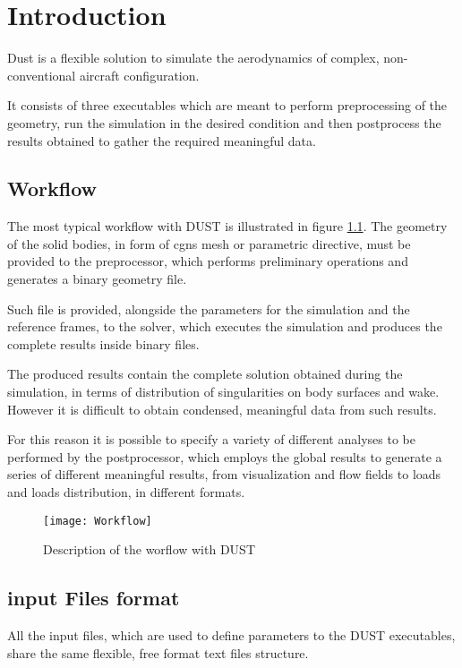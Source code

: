 \chapter{Introduction}

Dust is a flexible solution to simulate the aerodynamics of complex, non-conventional aircraft configuration.

It consists of three executables which are meant to perform preprocessing of the geometry, run the simulation in the desired condition and then postprocess the results obtained to gather the required meaningful data. 

\section{Workflow}
\label{sec:Workflow}

The most typical workflow with DUST is illustrated in figure \ref{fig:worflow}.  The geometry of the solid bodies, in form of cgns mesh or parametric directive, must be provided to the preprocessor, which performs preliminary operations and generates a binary geometry file. 

Such file is provided, alongside the parameters for the simulation and the reference frames, to the solver, which executes the simulation and produces the complete results inside binary files. 

The produced results contain the complete solution obtained during the simulation, in terms of distribution of singularities on body surfaces and wake. However it is difficult to obtain condensed, meaningful data from such results.

For this reason it is possible to specify a variety of different analyses to be performed by the postprocessor, which employs the global results to generate a series of different meaningful results, from visualization and flow fields to loads and loads distribution, in different formats.

\begin{figure}[h]
\centering
\texttt{[image: Workflow]}
\caption{Description of the worflow with DUST}
\label{fig:worflow}
\end{figure}



\section{input Files format}
\label{sec:InputFilesFormat}
All the input files, which are used to define parameters to the DUST executables, share the same flexible, free format text files structure.

